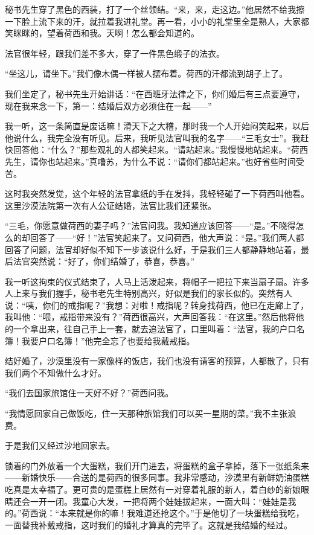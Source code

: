 \par 秘书先生穿了黑色的西装，打了一个丝领结。“来，来，走这边。”他居然不给我擦一下脸上流下来的汗，就拉着我进礼堂。再一看，小小的礼堂里全是熟人，大家都笑眯眯的，望着荷西和我。天啊！怎么都会知道的。
\par 法官很年轻，跟我们差不多大，穿了一件黑色缎子的法衣。
\par “坐这儿，请坐下。”我们像木偶一样被人摆布着。荷西的汗都流到胡子上了。
\par 我们坐定了，秘书先生开始讲话：“在西班牙法律之下，你们婚后有三点要遵守，现在我来念一下，第一：结婚后双方必须住在一起——”
\par 我一听，这一条简直是废话嘛！滑天下之大稽，那时我一个人开始闷笑起来，以后他说什么，我完全没有听见。后来，我听见法官叫我的名字——“三毛女士”。我赶快回答他：“什么？”那些观礼的人都笑起来。“请站起来。”我慢慢地站起来。“荷西先生，请你也站起来。”真噜苏，为什么不说：“请你们都站起来。”也好省些时间受苦。
\par 这时我突然发觉，这个年轻的法官拿纸的手在发抖，我轻轻碰了一下荷西叫他看。这里沙漠法院第一次有人公证结婚，法官比我们还紧张。
\par “三毛，你愿意做荷西的妻子吗？”法官问我。我知道应该回答——“是。”不晓得怎么的却回答了——“好！”法官笑起来了。又问荷西，他大声说：“是。”我们两人都回答了问题，法官却好似不知下一步该说什么好，于是我们三人都静静地站着，最后法官突然说：“好了，你们结婚了，恭喜，恭喜。”
\par 我一听这拘束的仪式结束了，人马上活泼起来，将帽子一把拉下来当扇子扇。许多人上来与我们握手，秘书老先生特别高兴，好似是我们的家长似的。突然有人说：“咦，你们的戒指呢？”我想：对啦！戒指呢？转身找荷西，他已在走廊上了，我叫他：“喂，戒指带来没有？”荷西很高兴，大声回答我：“在这里。”然后他将他的一个拿出来，往自己手上一套，就去追法官了，口里叫着：“法官，我的户口名簿！我要户口名簿！”他完全忘了也要给我戴戒指。
\par 结好婚了，沙漠里没有一家像样的饭店，我们也没有请客的预算，人都散了，只有我们两个不知做什么才好。
\par “我们去国家旅馆住一天好不好？”荷西问我。
\par “我情愿回家自己做饭吃，住一天那种旅馆我们可以买一星期的菜。”我不主张浪费。
\par 于是我们又经过沙地回家去。
\par 锁着的门外放着一个大蛋糕，我们开门进去，将蛋糕的盒子拿掉，落下一张纸条来——新婚快乐——合送的是荷西的很多同事。我非常感动，沙漠里有新鲜奶油蛋糕吃真是太幸福了。更可贵的是蛋糕上居然有一对穿着礼服的新人，着白纱的新娘眼睛还会一开一闭。我童心大发，一把将两个娃娃拔起来，一面大叫：“娃娃是我的。”荷西说：“本来就是你的嘛！我难道还抢这个。”于是他切了一块蛋糕给我吃，一面替我补戴戒指，这时我们的婚礼才算真的完毕了。这就是我结婚的经过。

